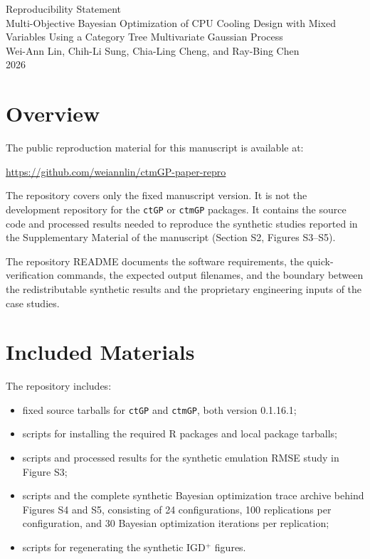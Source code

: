 \documentclass[11pt]{article}
\begin{document}
\begin{center}
{\Large Reproducibility Statement}\\[0.75em]
{\large Multi-Objective Bayesian Optimization of CPU Cooling Design with Mixed Variables Using a Category Tree Multivariate Gaussian Process}\\[0.5em]
Wei-Ann Lin, Chih-Li Sung, Chia-Ling Cheng, and Ray-Bing Chen\\
2026
\end{center}

\section*{Overview}

The public reproduction material for this manuscript is available at:

\begin{center}
\url{https://github.com/weiannlin/ctmGP-paper-repro}
\end{center}

The repository covers only the fixed manuscript version. It is not the development repository for the \texttt{ctGP} or \texttt{ctmGP} packages. It contains the source code and processed results needed to reproduce the synthetic studies reported in the Supplementary Material of the manuscript (Section S2, Figures S3--S5).

The repository README documents the software requirements, the quick-verification commands, the expected output filenames, and the boundary between the redistributable synthetic results and the proprietary engineering inputs of the case studies.

\section*{Included Materials}

The repository includes:
\begin{itemize}
  \item fixed source tarballs for \texttt{ctGP} and \texttt{ctmGP}, both version 0.1.16.1;
  \item scripts for installing the required R packages and local package tarballs;
  \item scripts and processed results for the synthetic emulation RMSE study in Figure S3;
  \item scripts and the complete synthetic Bayesian optimization trace archive behind Figures S4 and S5, consisting of 24 configurations, 100 replications per configuration, and 30 Bayesian optimization iterations per replication;
  \item scripts for regenerating the synthetic IGD$^+$ figures.
\end{itemize}
\end{document}
